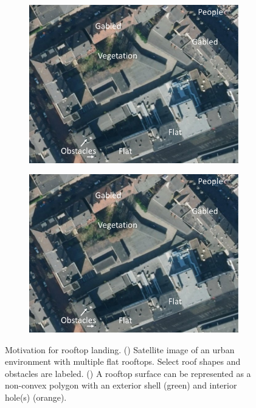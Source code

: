 \begin{figure}[!h]
    \centering
  \begin{subfigure}{.40\linewidth}
    \centering
    \includegraphics[page=1,clip, trim=0.0cm 0cm 0cm 0.0cm, width=0.95\linewidth]{chapter_1_intro/imgs/Motivation.pdf}
    \caption{}
    \label{fig:ch1_challenge_urban}
  \end{subfigure}
  \begin{subfigure}{.40\linewidth}
    \centering\includegraphics[page=2, width=.95\linewidth]{chapter_1_intro/imgs/Motivation.pdf}
    \caption{}
    \label{fig:ch1_roof_shape_obstacle}
  \end{subfigure}
  \caption[Motivation for rooftop landing]{Motivation for rooftop landing. () Satellite image of an urban environment with multiple flat rooftops. Select roof shapes and obstacles are labeled.  () A rooftop surface can be represented as a non-convex polygon with an exterior shell (green) and interior hole(s) (orange).  }\label{fig:ch1_motivation}
\end{figure}


